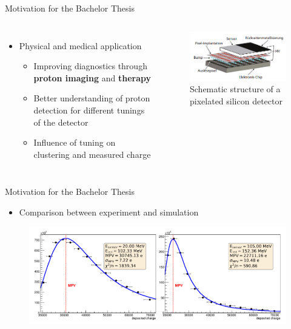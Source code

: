 \begin{frame}{\huge{Motivation for the Bachelor Thesis}}
  \begin{columns}[t]
    \begin{itemize}
      \item Physical and medical application
      \begin{itemize}
        \item[\rightarrow] Improving diagnostics through \textbf{proton imaging} and \textbf{therapy}
        \item[\rightarrow] Better understanding of proton detection for different tunings of the detector
        \item[\rightarrow] Influence of tuning on clustering and measured charge
      \end{itemize}
    \end{itemize}
  \begin{figure}
    \label{fig:pixde}
    \centering
    \includegraphics[width=.9\textwidth]{figures/detektor.png}
    \caption*{Schematic structure of a pixelated silicon detector \cite[p.~334]{kola}}
  \end{figure}
\end{columns}
\end{frame}
\begin{frame}{\huge{Motivation for the Bachelor Thesis}}
  \begin{itemize}
    \item Comparison between experiment and simulation
  \end{itemize}
\begin{figure}
  \label{fig:landau}
  \centering
  \includegraphics[width=.9\textwidth]{figures/landau_comp.png}
\end{figure}
\end{frame}
